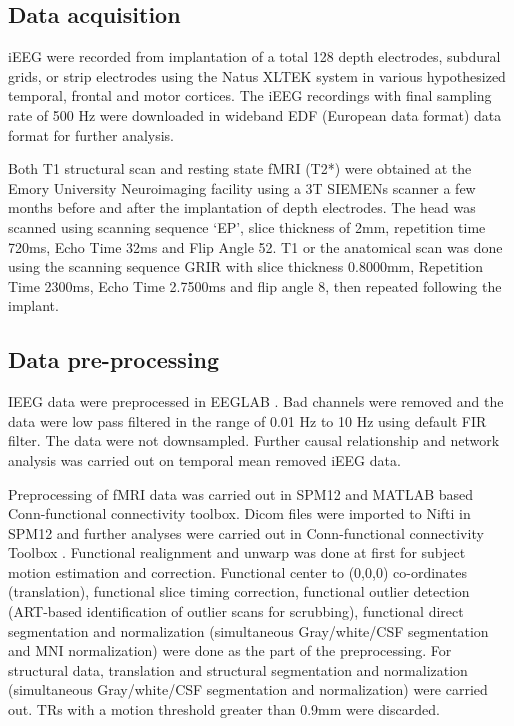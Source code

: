 \subsection{Data acquisition}
iEEG were recorded from implantation of a total 128 depth electrodes, subdural grids, or strip electrodes using the Natus XLTEK system in various hypothesized temporal, frontal and motor cortices. The iEEG recordings with final sampling rate of 500 Hz were downloaded in wideband EDF (European data format) data format for further analysis.

Both T1 structural scan and resting state fMRI (T2*) were obtained at the Emory University Neuroimaging facility using a 3T SIEMENs scanner a few months before and after the implantation of depth electrodes. The head was scanned using scanning sequence ‘EP’, slice thickness of 2mm, repetition time 720ms, Echo Time 32ms and Flip Angle 52. T1 or the anatomical scan was done using the scanning sequence GRIR with slice thickness 0.8000mm, Repetition Time 2300ms, Echo Time 2.7500ms and flip angle 8, then repeated following the implant.

\subsection{Data pre-processing}
IEEG data were preprocessed in EEGLAB \citep{delorme2004eeglab}. Bad channels were removed and the data were low pass filtered in the range of 0.01 Hz to 10 Hz using default FIR filter. The data were not downsampled. Further causal relationship and network analysis was carried out on temporal mean removed iEEG data.

Preprocessing of fMRI data was carried out in SPM12 and MATLAB based Conn-functional connectivity toolbox. Dicom files were imported to Nifti in SPM12 \citep{ashburner2014spm12} and further analyses were carried out in Conn-functional connectivity Toolbox \citep{whitfield2012conn}. Functional realignment and unwarp was done at first for subject motion estimation and correction. Functional center to (0,0,0) co-ordinates (translation), functional slice timing correction, functional outlier detection (ART-based identification of outlier scans for scrubbing), functional direct segmentation and normalization (simultaneous Gray/white/CSF segmentation and MNI normalization) were done as the part of the preprocessing. For structural data, translation and structural segmentation and normalization (simultaneous Gray/white/CSF segmentation and normalization) were carried out. TRs with a motion threshold greater than 0.9mm were discarded.

